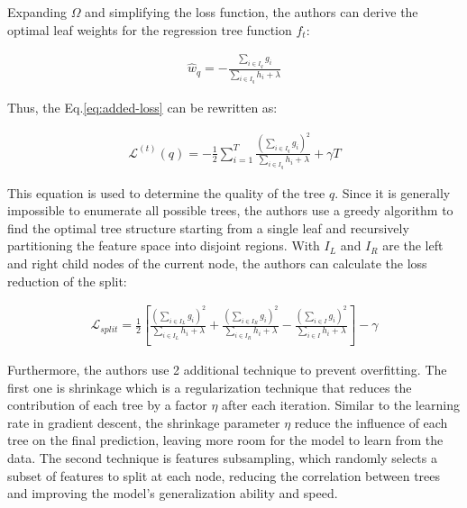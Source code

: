 \documentclass[../main.tex]{subfiles}
\begin{document}
Expanding $\Omega$ and simplifying the loss function, the authors can derive the optimal leaf weights for the regression tree function $f_t$:

\begin{equation}
    \label{eq:optimal-leaf-weights}
    \begin{aligned}
        \hat{w}_{q} = - \frac{\sum_{i \in I_q} g_i}{\sum_{i \in I_q} h_i + \lambda}
    \end{aligned}
\end{equation}

Thus, the Eq.\ref{eq:added-loss} can be rewritten as:

\begin{equation}
    \begin{aligned}
        \mathcal{L}^{(t)}(q) = - \frac{1}{2} \sum_{i=1}^T \frac{(\sum_{i \in I_q} g_i)^2}{\sum_{i \in I_q} h_i + \lambda} + \gamma T
    \end{aligned}
\end{equation}

This equation is used to determine the quality of the tree $q$.
Since it is generally impossible to enumerate all possible trees, the authors use a greedy algorithm to find the optimal tree structure starting from a single leaf and recursively partitioning the feature space into disjoint regions.
With $I_L$ and $I_R$ are the left and right child nodes of the current node, the authors can calculate the loss reduction of the split:

\begin{equation}
    \begin{aligned}
        \mathcal{L}_{split} = \frac{1}{2} \left[ \frac{(\sum_{i \in I_L} g_i)^2}{\sum_{i \in I_L} h_i + \lambda} + \frac{(\sum_{i \in I_R} g_i)^2}{\sum_{i \in I_R} h_i + \lambda} - \frac{(\sum_{i \in I} g_i)^2}{\sum_{i \in I} h_i + \lambda} \right] - \gamma
    \end{aligned}
\end{equation}

Furthermore, the authors use 2 additional technique to prevent overfitting.
The first one is shrinkage which is a regularization technique that reduces the contribution of each tree by a factor $\eta$ after each iteration.
Similar to the learning rate in gradient descent, the shrinkage parameter $\eta$ reduce the influence of each tree on the final prediction, leaving more room for the model to learn from the data.
The second technique is features subsampling, which randomly selects a subset of features to split at each node, reducing the correlation between trees and improving the model's generalization ability and speed.
\end{document}
